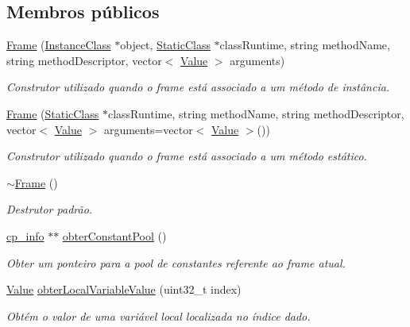 \subsection*{Membros públicos}
\begin{DoxyCompactItemize}
\item 
\hyperlink{classFrame_a3318a2cfd762b3a31adc4f101cb006e6}{Frame} (\hyperlink{classInstanceClass}{Instance\+Class} $\ast$object, \hyperlink{classStaticClass}{Static\+Class} $\ast$class\+Runtime, string method\+Name, string method\+Descriptor, vector$<$ \hyperlink{structValue}{Value} $>$ arguments)
\begin{DoxyCompactList}\small\item\em Construtor utilizado quando o frame está associado a um método de instância. \end{DoxyCompactList}\item 
\hyperlink{classFrame_aa4ea414fba16a44e8c556bb0b9cfc831}{Frame} (\hyperlink{classStaticClass}{Static\+Class} $\ast$class\+Runtime, string method\+Name, string method\+Descriptor, vector$<$ \hyperlink{structValue}{Value} $>$ arguments=vector$<$ \hyperlink{structValue}{Value} $>$())
\begin{DoxyCompactList}\small\item\em Construtor utilizado quando o frame está associado a um método estático. \end{DoxyCompactList}\item 
\hyperlink{classFrame_abec8c7bccdfc88cb4da137caae9f73d6}{$\sim$\+Frame} ()
\begin{DoxyCompactList}\small\item\em Destrutor padrão. \end{DoxyCompactList}\item 
\hyperlink{structcp__info}{cp\+\_\+info} $\ast$$\ast$ \hyperlink{classFrame_a77f9705e64bfbdfc68921b7de11a893f}{obter\+Constant\+Pool} ()
\begin{DoxyCompactList}\small\item\em Obter um ponteiro para a pool de constantes referente ao frame atual. \end{DoxyCompactList}\item 
\hyperlink{structValue}{Value} \hyperlink{classFrame_ae074652eb3b71fb4cb28afd1ba91885d}{obter\+Local\+Variable\+Value} (uint32\+\_\+t index)
\begin{DoxyCompactList}\small\item\em Obtém o valor de uma variável local localizada no índice dado. \end{DoxyCompactList}\item 
$$
\end{DoxyCompactItemize}
